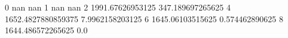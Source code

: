 0 nan nan
1 nan nan
2 1991.67626953125 347.189697265625
4 1652.4827880859375 7.9962158203125
6 1645.06103515625 0.574462890625
8 1644.486572265625 0.0
